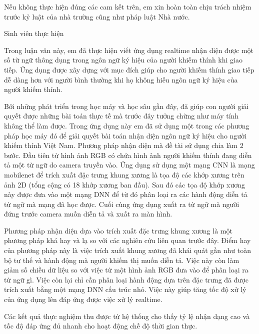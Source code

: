 Nếu không thực hiện đúng các cam kết trên, em xin hoàn toàn chịu trách nhiệm trước kỷ luật của nhà trường cũng như pháp luật Nhà nước.

\begin{flushright}
Sinh viên thực hiện
\end{flushright}


\newpage
{}
\thispagestyle{tom_tat}
\begin{center}
{}
\end{center}

Trong luận văn này, em đã thực hiện viết ứng dụng realtime nhận diện được một số từ ngữ thông dụng trong ngôn ngữ ký hiệu của người khiếm thính khi giao tiếp. Ứng dụng được xây dựng với mục đích giúp cho người khiếm thính giao tiếp dễ dàng hơn với người bình thường khi họ không hiếu ngôn ngữ ký hiệu của người khiếm thính.

Bởi những phát triển trong học máy và học sâu gần đây, đã giúp con người giải quyết được những bài toán thực tế mà trước đây tưởng chừng như máy tính không thể làm được. Trong ứng dụng này em đã sử dụng một trong các phương pháp học máy đó để giải quyết bài toán nhận diện ngôn ngữ ký hiệu cho người khiếm thính Việt Nam. Phương pháp nhận diện mà đề tài sử dụng chia làm 2 bước. Đầu tiên từ hình ảnh RGB có chứa hình ảnh người khiếm thính đang diễn tả một từ ngữ do camera truyền vào. Ứng dụng sử dụng một mạng CNN là mạng mobilenet để trích xuất đặc trưng khung xương là tọa độ các khớp xương trên ảnh 2D (tổng cộng có 18 khớp xương ban đầu). Sau đó các tọa độ khớp xương này được đưa vào một mạng DNN để từ đó phân loại ra các hành động diễn tả từ ngữ mà mạng đã học được. Cuối cùng ứng dụng xuất ra từ ngữ mà người đứng trước camera muốn diễn tả và xuất ra màn hình.

Phương pháp nhận diện dựa vào trích xuất đặc trưng khung xương là một phương pháp khá hay và lạ so với các nghiên cứu liên quan trước đây. Điểm hay của phương pháp này là việc trích xuất khung xương đã khái quát gần như toàn bộ tư thế và hành động mà người khiếm thị muốn diễn tả. Việc này còn làm giảm số chiều dữ liệu so với việc từ một hình ảnh RGB đưa vào để phân loại ra từ ngữ gì. Việc còn lại chỉ cần phân loại hành động dựa trên đặc trưng đã được trích xuất bằng một mạng DNN cấu trúc nhỏ. Việc này giúp tăng tốc độ xử lý của ứng dụng lên đáp ứng được việc xử lý realtime.

Các kết quả thực nghiệm thu được từ hệ thống cho thấy tỷ lệ nhận dạng cao và tốc độ đáp ứng đủ nhanh cho hoạt động chế độ thời gian thực.


